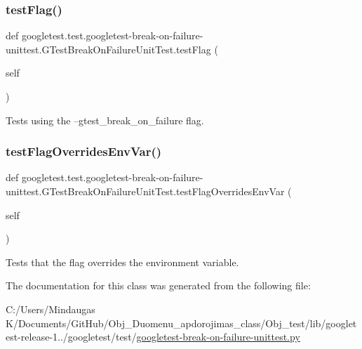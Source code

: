 \subsubsection{\texorpdfstring{testFlag()}{testFlag()}}
{\footnotesize\ttfamily def googletest.\+test.\+googletest-\/break-\/on-\/failure-\/unittest.\+G\+Test\+Break\+On\+Failure\+Unit\+Test.\+test\+Flag (\begin{DoxyParamCaption}\item[{}]{self }\end{DoxyParamCaption})}

\begin{DoxyVerb}Tests using the --gtest_break_on_failure flag.\end{DoxyVerb}
 \mbox{\label{classgoogletest_1_1test_1_1googletest-break-on-failure-unittest_1_1_g_test_break_on_failure_unit_test_a0316075696440116afc33c624735422f}} 
\subsubsection{\texorpdfstring{testFlagOverridesEnvVar()}{testFlagOverridesEnvVar()}}
{\footnotesize\ttfamily def googletest.\+test.\+googletest-\/break-\/on-\/failure-\/unittest.\+G\+Test\+Break\+On\+Failure\+Unit\+Test.\+test\+Flag\+Overrides\+Env\+Var (\begin{DoxyParamCaption}\item[{}]{self }\end{DoxyParamCaption})}

\begin{DoxyVerb}Tests that the flag overrides the environment variable.\end{DoxyVerb}
 

The documentation for this class was generated from the following file\+:\begin{DoxyCompactItemize}
\item 
C\+:/\+Users/\+Mindaugas K/\+Documents/\+Git\+Hub/\+Obj\+\_\+\+Duomenu\+\_\+apdorojimas\+\_\+class/\+Obj\+\_\+test/lib/googletest-\/release-\/1../googletest/test/\mbox{\hyperlink{_obj__test_2lib_2googletest-release-1_88_81_2googletest_2test_2googletest-break-on-failure-unittest_8py}{googletest-\/break-\/on-\/failure-\/unittest.\+py}}\end{DoxyCompactItemize}
